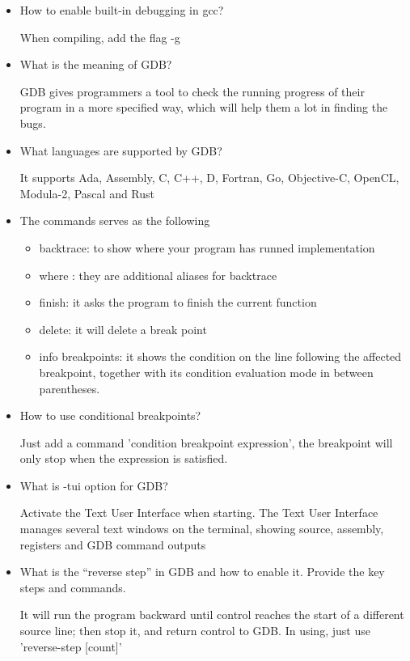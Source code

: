 \documentclass{article}
\begin{document}
\begin{itemize}
\item How to enable built-in debugging in gcc?

When compiling, add the flag -g 

\item What is the meaning of GDB?

GDB gives programmers a tool to check the running progress of their program in a more specified way, which will help them a lot in finding the bugs.

\item What languages are supported by GDB?

It supports Ada, Assembly, C, C++, D, Fortran, Go, Objective-C, OpenCL, Modula-2, Pascal and Rust

\item The commands serves as the following 

\begin{itemize}
    \item backtrace: to show where your program has runned implementation
    \item where : they are additional aliases for backtrace 
    \item finish: it asks the program to finish the current function
    \item delete: it will delete a break point 
    \item info breakpoints: it shows the condition on the line following the affected breakpoint, together with its condition evaluation mode in between parentheses. 
\end{itemize}
\item How to use conditional breakpoints?

Just add a command 'condition breakpoint expression', the breakpoint will only stop when the expression is satisfied.

\item What is -tui option for GDB?

Activate the Text User Interface when starting. The Text User Interface manages several text windows on the terminal, showing source, assembly, registers and GDB command outputs 

\item What is the “reverse step” in GDB and how to enable it. Provide the key steps and commands.

It will run the program backward until control reaches the start of a different source line; then stop it, and return control to GDB. In using, just use 'reverse-step [count]'

\end{itemize}
\end{document}
